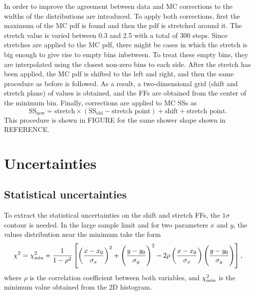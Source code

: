 In order to improve the agreement between data and \ac{MC} corrections to the widths of the distributions are introduced. To apply both corrections, first the maximum of the \ac{MC} \ac{pdf} is found and then the \ac{pdf} is stretched around it. The stretch value is varied between 0.3 and 2.5 with a total of 300 steps. Since stretches are applied to the \ac{MC} \ac{pdf}, there might be cases in which the stretch is big enough to give rise to empty bins inbetween. To treat these empty bins, they are interpolated using the closest non-zero bins to each side. After the stretch has been applied, the \ac{MC} \ac{pdf} is shifted to the left and right, and then the same procedure as before is followed. As a result, a two-dimensional grid (shift and stretch plane) of \chisq values is obtained, and the \acp{FF} are obtained from the center of the minimum bin. Finally, corrections are applied to \ac{MC} \acp{SS} as
\begin{equation}
	\text{SS}_{\text{new}} = \text{stretch}\times(\text{SS}_{\text{old}} - \text{stretch point}) + \text{shift} + \text{stretch point}.
\end{equation}
This procedure is shown in FIGURE for the same shower shape shown in REFERENCE.









\section{Uncertainties}

\subsection{Statistical uncertainties}

To extract the statistical uncertainties on the shift and stretch \acp{FF}, the \(1\sigma\) contour is needed. In the large sample limit and for two parameters \(x\) and \(y\), the \chisq values distribution near the minimum take the form
\begin{equation}
    \chi^{2} = \chi^{2}_{\text{min}} + \frac{1}{1-\rho^2} \left[ \left( \frac{x-x_0}{\sigma_x} \right)^2 + \left( \frac{y-y_0}{\sigma_y} \right)^2 - 2\rho \left( \frac{x-x_0}{\sigma_x} \right) \left( \frac{y-y_0}{\sigma_y} \right) \right],
\end{equation}
where \(\rho\) is the correlation coefficient between both variables, and \(\chi^{2}_{\text{min}}\) is the \chisq minimum value obtained from the 2D histogram.

